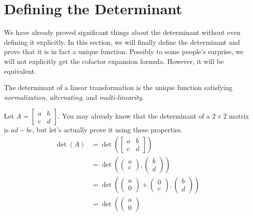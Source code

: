 \section{Defining the Determinant}
We have already proved significant things about the determinant without even defining it explicitly. In this section, we will finally define the determinant and prove that it is in fact a unique function. Possibly to some people's surprise, we will not explicitly get the cofactor expansion formula. However, it will be equivalent.
\begin{definition}
    The determinant of a linear transformation is the unique function satisfying \textit{normalization}, \textit{alternating}, and \textit{multi-linearity}.
\end{definition}
\begin{example}
    Let $A=\begin{bmatrix}
        a & b \\
        c & d
    \end{bmatrix}$. You may already know that the determinant of a $2\times 2$ matrix is $ad-bc$, but let's actually prove it using these properties.
    \begin{align*}
        \det(A)&=\det\left(\begin{bmatrix}
        a & b \\
        c & d
    \end{bmatrix}\right)\\
    &=\det\left(\begin{pmatrix}
        a \\ c
    \end{pmatrix}, \begin{pmatrix}
        b \\ d
    \end{pmatrix}\right)\\
    &=\det\left(\begin{pmatrix}
        a \\ 0
    \end{pmatrix}+\begin{pmatrix}
        0 \\ c
    \end{pmatrix}, \begin{pmatrix}
        b \\ d
    \end{pmatrix}\right)\\
    &=\det\left(\begin{pmatrix}
        a \\ 0

\end{pmatrix}
\end{align*}
\end{example}
